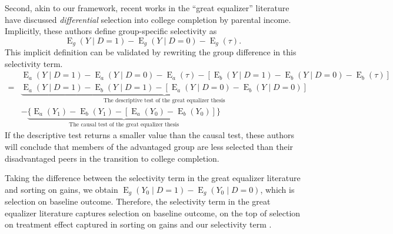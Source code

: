 \documentclass[12pt,a4paper]{article}
\newcommand{\E}{\operatorname{E}}
\begin{document}
Second, akin to our framework, recent works in the ``great equalizer'' literature  \citep{zhou_equalization_2019, fiel_great_2020, karlson_college_2019} have discussed \emph{differential} selection into college completion by parental income. Implicitly, these authors define group-specific selectivity as 
\begin{equation*}
    \E_g(Y \mid  D=1) - \E_g(Y \mid  D=0) - \E_g(\tau).
\end{equation*}
This implicit definition can be validated by rewriting the group difference in this selectivity term.
\begin{align*}
    \phantom{{}={}}& \E_a(Y \mid  D=1) - \E_a(Y  \mid  D=0) - \E_a(\tau) - [\E_b(Y \mid  D=1) - \E_b(Y  \mid  D=0) - \E_b(\tau)] \\
    =& \underbrace{\E_a(Y \mid  D=1)-\E_b(Y \mid  D=1) - [ \E_a(Y \mid  D=0)-\E_b(Y \mid  D=0)]}_{\text{The descriptive test of the great equalizer thesis}}  \\
    \phantom{{}={}}&- \underbrace{\lbrace \E_a(Y_1)-\E_b(Y_1) - [\E_a(Y_0)-\E_b(Y_0)] \rbrace}_{\text{The causal test of the great equalizer thesis}} 
\end{align*}
If the descriptive test returns a smaller value than the causal test, these authors will conclude that members of the advantaged group are less selected than their disadvantaged peers in the transition to college completion. 

Taking the difference between the selectivity term in the great equalizer literature and sorting on gains, we obtain $\E_g(Y_0 \mid  D=1)-\E_g(Y_0 \mid  D=0)$, which is selection on baseline outcome.
Therefore, the selectivity term in the great equalizer literature captures  selection on baseline outcome, on the top of selection on treatment effect captured in sorting on gains and our selectivity term \citep[See][p.58-9]{morgan_counterfactuals_2014}. 
\end{document}
